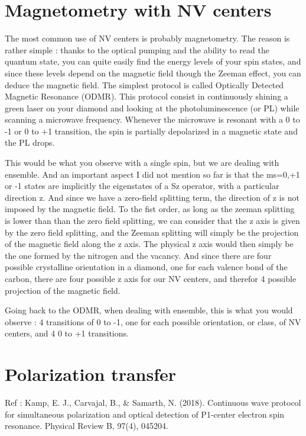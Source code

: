 \documentclass[a4paper]{article}
\begin{document}
\section{Magnetometry with NV centers}
The most common use of NV centers is probably magnetometry. The reason is rather simple : thanks to the optical pumping and the ability to read the quantum state, you can quite easily find the energy levels of your spin states, and since these levels depend on the magnetic field though the Zeeman effect, you can deduce the magnetic field. 
The simplest protocol is called Optically Detected Magnetic Resonance (ODMR). This protocol consist in continuously shining a green laser on your diamond and looking at the photoluminescence (or PL) while scanning a microwave frequency. Whenever the microwave is resonant with a 0 to -1 or 0 to +1 transition, the spin is partially depolarized in a magnetic state and the PL drops.%

This would be what you observe with a single spin, but we are dealing with ensemble. And an important aspect I did not mention so far is that the ms=0,+1 or -1 states are implicitly the eigenstates of a Sz operator, with a particular direction z. And since we have a zero-field splitting term, the direction of z is not imposed by the magnetic field. To the fist order, as long as the zeeman splitting is lower than than the zero field splitting, we can consider that the z axis is given by the zero field splitting, and the Zeeman splitting will simply be the projection of the magnetic field along the z axis. 
The physical z axis would then simply be the one formed by the nitrogen and the vacancy. And since there are four possible crystalline orientation in a diamond, one for each valence bond of the carbon, there are four possible z axis for our NV centers, and therefor 4 possible projection of the magnetic field. %

Going back to the ODMR, when dealing with ensemble, this is what you would observe : 4 transitions of 0 to -1, one for each possible orientation, or class, of NV centers, and 4 0 to +1 transitions.

\section{Polarization transfer}
Ref : Kamp, E. J., Carvajal, B., \& Samarth, N. (2018). Continuous wave protocol for simultaneous polarization and optical detection of P1-center electron spin resonance. Physical Review B, 97(4), 045204.
\end{document}

